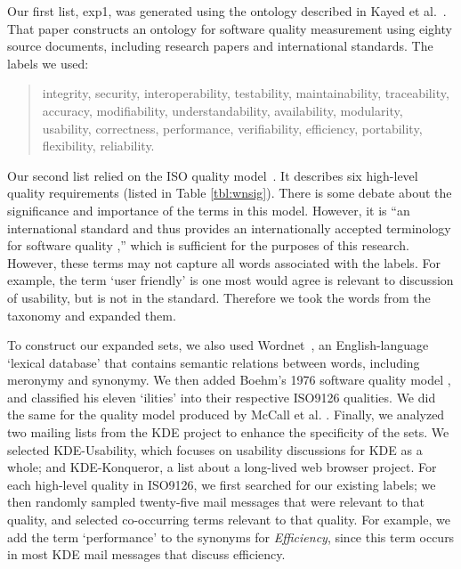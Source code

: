 \documentclass[10pt, conference, compsocconf]{IEEEtran}
\begin{document}
Our first list, \textsf{exp1}, was generated using the ontology described in Kayed et al.~\cite{5072519}. That paper constructs an ontology for software quality measurement using eighty source documents, including research papers and international standards. The labels we used:
\begin{quotation}
\small \noindent \textsf{
integrity, security,
interoperability, testability, maintainability, traceability,
accuracy, modifiability, understandability, availability, modularity,
usability, correctness, performance, verifiability, efficiency,
portability, flexibility, reliability.
}
\end{quotation}

Our second list relied on the ISO quality model~\cite{iso9126}. It describes six high-level quality requirements (listed in Table \ref{tbl:wnsig}). There is some debate about the significance and importance of the terms in this model. However, it is ``an international standard and thus provides an internationally accepted terminology for software quality \cite[p. 58]{Bøegh2008},'' which is sufficient for the purposes of this research. However, these terms may not capture all words associated with the labels.  For example, the term ‘user friendly’ is one most would agree is relevant to discussion of usability, but is not in the standard. Therefore we took the words from the taxonomy and expanded them.

To construct our expanded sets, we also used Wordnet~\cite{Fellbaum1998}, an English-language ‘lexical database’ that contains semantic relations between words, including meronymy and synonymy. We then added Boehm’s 1976 software quality model \cite{Boehm+:1976:ICSE}, and classified his eleven ‘ilities’ into their respective ISO9126 qualities. We did the same for the quality model produced by McCall et al. \cite{mccall1977}. Finally, we analyzed two mailing lists from the KDE project to enhance the specificity of the sets. We selected KDE-Usability, which focuses on usability discussions for KDE as a whole; and KDE-Konqueror, a list about a long-lived web browser project. For each high-level quality in ISO9126, we first searched for our existing labels; we then randomly sampled twenty-five mail messages that were relevant to that quality, and selected co-occurring terms relevant to that quality. For example, we add the term ‘performance’ to the synonyms for \emph{Efficiency}, since this term occurs in most KDE mail messages that discuss efficiency.
\end{document}
